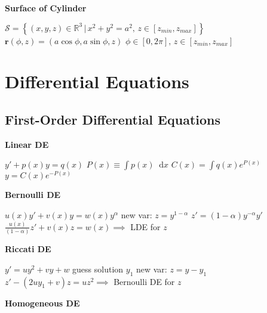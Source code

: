 \documentclass[10pt, a4paper]{article}
\newcommand*\diff{\mathop{}\!\mathrm{d}} %
\newcommand{\R}{\mathbb{R}} %
\begin{document}
\begin{multicols}{2}
\vspace{2mm}

\textbf{Surface of Cylinder}

$ \mathcal{S} = \left\{ (x, y, z) \in \R^3 \, | \, x^2 + y^2 = a^2, \, z \in [z_{min}, z_{max}] \right\} $  \newline
$ \bm{r}(\phi, z) = (a \cos \phi, a \sin \phi, z) $ \newline
$ \phi \in [0, 2\pi], \, z \in [z_{min}, z_{max}]  $
\vspace{-4mm}

\section*{Differential Equations} \vspace{-2mm}

\subsection*{First-Order Differential Equations} \vspace{-1mm}

\textbf{Linear DE}

$  y' + p(x)y = q(x) $  \vspace{1mm} \newline
$ P(x) \equiv \int p(x) \diff x $ \quad $ C(x) = \int q(x) e^{P(x)}  $ \vspace{1mm} \newline 
$ y = C(x) e^{-P(x)}$  

 \vspace{1mm} 
\textbf{Bernoulli DE}

$ u(x) y' + v(x) y = w(x) y^\alpha $ \vspace{1mm} \newline
new var: $ z = y^{1-\alpha} $ \quad $ z' = (1-\alpha)y^{-\alpha} y' $\vspace{1mm} \newline
$ \frac{u(x)}{(1-\alpha)}z' + v(x) z = w(x) \implies$ LDE for $ z $ 

\vspace{1mm}
\textbf{Riccati DE}

$ y' = u y^2 + v y + w $ \newline
guess solution $ y_1 $ \quad new var: $ z = y - y_1 $ \vspace{1mm} \newline
$ z' - (2uy_1 + v)z = uz^2 \implies $ Bernoulli DE for $ z $ 

\vspace{1mm}
\textbf{Homogeneous DE}


\end{multicols}
\end{document}
